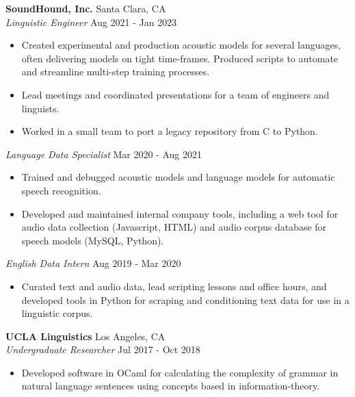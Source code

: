 \documentclass[]{article}
\begin{document}
	\textbf{SoundHound, Inc.} \hfill Santa Clara, CA\\
	\textit{Linguistic Engineer} \hfill Aug 2021 - Jan 2023\\
	\vspace{-3mm}
	\begin{itemize} \itemsep 0pt
		\item Created experimental and production acoustic models for several languages, often delivering models on tight time-frames.  Produced scripts to automate and streamline multi-step training processes.
		\item Lead meetings and coordinated presentations for a team of engineers and linguists.
		\item Worked in a small team to port a legacy repository from C to Python. 
	\end{itemize}
	\textit{Language Data Specialist} \hfill Mar 2020 - Aug 2021\\
	\vspace{-3mm}
	\begin{itemize} \itemsep 0pt
		\item Trained and debugged acoustic models and language models for automatic speech recognition.  
		\item Developed and maintained internal company tools, including a web tool for audio data collection (Javascript, HTML) and audio corpus database for speech models (MySQL, Python).
	\end{itemize}
	\textit{English Data Intern} \hfill Aug 2019 - Mar 2020\\
	\vspace{-3mm}
	\begin{itemize} \itemsep 0pt
		\item Curated text and audio data, lead scripting lessons and office hours, and developed tools in Python for scraping and conditioning text data for use in a linguistic corpus.
	\end{itemize}
	\vspace{1mm}
	
	\textbf{UCLA Linguistics} \hfill Los Angeles, CA\\
	\textit{Undergraduate Researcher} \hfill Jul 2017 - Oct 2018\\
	\vspace{-3mm}
	\begin{itemize} \itemsep 0pt
		\item Developed software in OCaml for calculating the complexity of grammar in natural language sentences using concepts based in information-theory.
	\end{itemize}
	
\end{document}
